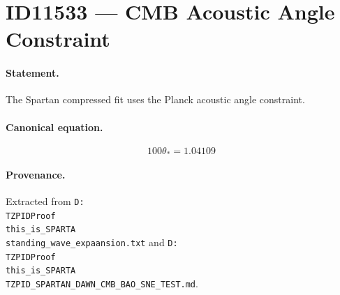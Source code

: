 \section*{ID11533 --- CMB Acoustic Angle Constraint}

\paragraph{Statement.}
The Spartan compressed fit uses the Planck acoustic angle constraint.

\paragraph{Canonical equation.}
\[
100\theta_*=1.04109
\]

\paragraph{Provenance.}
Extracted from \texttt{D:\\TZPIDProof\\this\_is\_SPARTA\\standing\_wave\_expaansion.txt} and \texttt{D:\\TZPIDProof\\this\_is\_SPARTA\\TZPID\_SPARTAN\_DAWN\_CMB\_BAO\_SNE\_TEST.md}.
